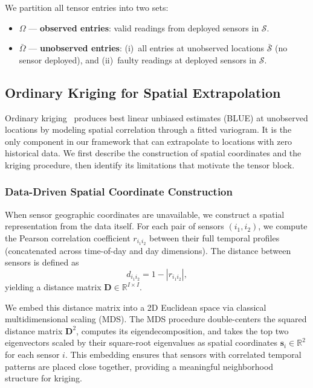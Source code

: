 \documentclass[journal]{IEEEtran}
\newcommand{\Sset}{\mathcal{S}}
\newcommand{\Sbar}{\bar{\mathcal{S}}}
\newcommand{\Omegaobs}{\Omega}
\newcommand{\Omegamis}{\bar{\Omega}}
\begin{document}
We partition all tensor entries into two sets:
\begin{itemize}
\item $\Omegaobs$ --- \textbf{observed entries}: valid readings from deployed sensors in $\Sset$.
\item $\Omegamis$ --- \textbf{unobserved entries}: (i)~all entries at unobserved locations $\Sbar$ (no sensor deployed), and (ii)~faulty readings at deployed sensors in $\Sset$.
\end{itemize}

\subsection{Ordinary Kriging for Spatial Extrapolation}\label{sec:kriging}

Ordinary kriging~\cite{cressie2015statistics} produces best linear unbiased estimates (BLUE) at unobserved locations by modeling spatial correlation through a fitted variogram. It is the only component in our framework that can extrapolate to locations with zero historical data. We first describe the construction of spatial coordinates and the kriging procedure, then identify its limitations that motivate the tensor block.

\subsubsection{Data-Driven Spatial Coordinate Construction}\label{sec:spatial_coords}

When sensor geographic coordinates are unavailable, we construct a spatial representation from the data itself. For each pair of sensors $(i_1, i_2)$, we compute the Pearson correlation coefficient $r_{i_1 i_2}$ between their full temporal profiles (concatenated across time-of-day and day dimensions). The distance between sensors is defined as
\begin{equation}\label{eq:dist}
d_{i_1 i_2} = 1 - |r_{i_1 i_2}|,
\end{equation}
yielding a distance matrix $\mathbf{D} \in \mathbb{R}^{I \times I}$.

We embed this distance matrix into a 2D Euclidean space via classical multidimensional scaling (MDS). The MDS procedure double-centers the squared distance matrix $\mathbf{D}^2$, computes its eigendecomposition, and takes the top two eigenvectors scaled by their square-root eigenvalues as spatial coordinates $\mathbf{s}_i \in \mathbb{R}^2$ for each sensor $i$. This embedding ensures that sensors with correlated temporal patterns are placed close together, providing a meaningful neighborhood structure for kriging.
\end{document}
